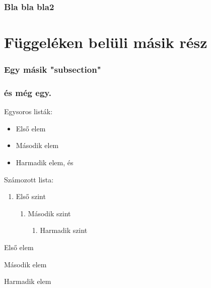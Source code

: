 \documentclass[12pt]{book}
\begin{document}
\subsection{Bla bla bla2}

\chapter{Függeléken belüli másik rész}
\subsection{Egy másik "subsection"}
\subsection{és még egy.}

Egysoros listák:
\begin{itemize}[label=\# , before=\hspace{0pt}, after=\hspace{0pt}]
    \item Első elem
    \item Második elem
    \item Harmadik elem, és
\end{itemize}

Számozott lista:
\begin{enumerate}
    \item Első szint
    \begin{enumerate}
        \renewcommand{\labelenumi}{\alph{enumi}.}  %
        \item Második szint
        \begin{enumerate}
            \item Harmadik szint
        \end{enumerate}
    \end{enumerate}
\end{enumerate}


\begin{myenum}
    \item Első elem
    \begin{myenum}
        \item Második elem
        \begin{myenum}
            \item Harmadik elem
        \end{myenum}
    \end{myenum}
\end{myenum}
\end{document}
